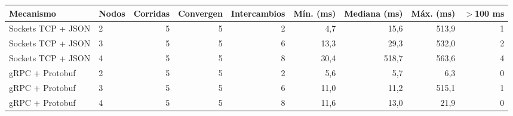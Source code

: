 \begin{tabular}{llrrrrrrr}
\toprule
Mecanismo & Nodos & Corridas & Convergen & Intercambios & Mín. (ms) & Mediana (ms) & Máx. (ms) & $>$100 ms \\
\midrule
Sockets TCP + JSON & 2 & 5 & 5 & 2 & 4,7 & 15,6 & 513,9 & 1 \\
Sockets TCP + JSON & 3 & 5 & 5 & 6 & 13,3 & 29,3 & 532,0 & 2 \\
Sockets TCP + JSON & 4 & 5 & 5 & 8 & 30,4 & 518,7 & 563,6 & 4 \\
gRPC + Protobuf & 2 & 5 & 5 & 2 & 5,6 & 5,7 & 6,3 & 0 \\
gRPC + Protobuf & 3 & 5 & 5 & 6 & 11,0 & 11,2 & 515,1 & 1 \\
gRPC + Protobuf & 4 & 5 & 5 & 8 & 11,6 & 13,0 & 21,9 & 0 \\
\bottomrule
\end{tabular}
